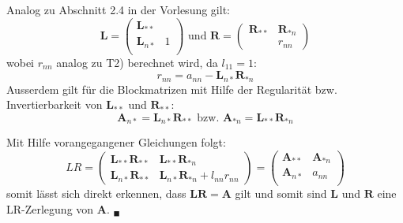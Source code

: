 \documentclass[11pt]{article}
\theoremstyle{plain}
\theoremstyle{definition}
\let\mbb\boldsymbol
\renewcommand\boldsymbol{\mbb}
\renewcommand{\a}{\"{a}}
\renewcommand{\u}{\"{u}}
\begin{document}
Analog zu Abschnitt 2.4 in der Vorlesung gilt:
\begin{equation}
\mbb{L} = 
\begin{pmatrix}
\mbb{L}_{**} & 		\\
\mbb{L}_{n*} & 1 \\
\end{pmatrix}
\text{ und }
\mbb{R} = 
\begin{pmatrix}
\mbb{R}_{**} & \mbb{R}_{*n} \\
& r_{nn}
\end{pmatrix}
\end{equation}
wobei $r_{nn}$ analog zu T2) berechnet wird, da $l_{11}=1$:
\begin{equation}
r_{nn} = a_{nn} - \mbb{L}_{n*}\mbb{R}_{*n}
\end{equation}
Ausserdem gilt f\u r die Blockmatrizen mit Hilfe der Regularit\a t bzw. Invertierbarkeit von $\mbb{L}_{**}$ und $\mbb{R}_{**}$: 
\begin{equation}
\mbb{A}_{n*}=\mbb{L}_{n*}\mbb{R}_{**}
\text{ bzw. } 
\mbb{A}_{*n}=\mbb{L}_{**}\mbb{R}_{*n}
\end{equation}


Mit Hilfe vorangegangener Gleichungen folgt:
\begin{equation}
LR = 
\begin{pmatrix}
\mbb{L}_{**}\mbb{R}_{**} & \mbb{L}_{**}\mbb{R}_{*n} \\
\mbb{L}_{n*}\mbb{R}_{**} & \mbb{L}_{n*}\mbb{R}_{*n}+l_{nn}r_{nn}
\end{pmatrix}
=
\begin{pmatrix}
\mbb{A}_{**} & \mbb{A}_{*n} \\
\mbb{A}_{n*} & a_{nn}   \\
\end{pmatrix}
\end{equation}
somit l\a sst sich direkt erkennen, dass $\mbb{L}\mbb{R}=\mbb{A}$ gilt und somit sind $\mbb{L}$ und $\mbb{R}$ eine LR-Zerlegung von $\mbb{A}$. $_\blacksquare$
 
 
 
 
 
 
 
 
 
 
 
 
 
 
 
 
 
 
 
\end{document}
